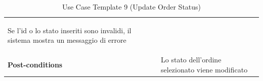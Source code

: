 \documentclass{article}
\begin{document}
\begin{table}
\begin{tabularx}{\textwidth}{|lX|}
\begin{description}[nosep,before=\leavevmode\vspace*{-1\baselineskip},after=\leavevmode\vspace*{-1\baselineskip}]
                                                                        \item [4a.] Se l'id o lo stato inseriti sono invalidi, il sistema mostra un messaggio di errore
                                                                    \end{description} \\
                    \rowcolor{white} \textbf{Post-conditions} & Lo stato dell'ordine selezionato viene modificato \\
                    \toprule
                \end{tabularx}
                \caption{Use Case Template 9 (Update Order Status)}
                \label{tab:use-case-template-9}
            \end{table}
\end{document}
